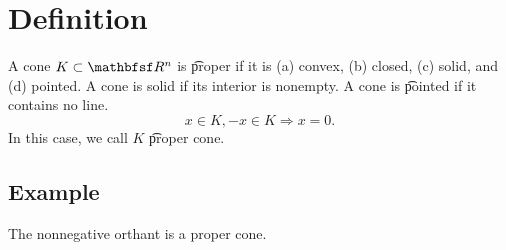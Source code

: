 
\section*{Definition}

A cone $K \subset \R ^n$ is \t{proper} if it is (a) convex, (b) closed, (c) solid, and (d) pointed.
A cone is solid if its interior is nonempty.
A cone is \t{pointed} if it contains no line.
\[
x \in K, -x \in K \Rightarrow x = 0.
\]
In this case, we call $K$ \t{proper cone}.

\subsection*{Example}

The nonnegative orthant is a proper cone.

\blankpage